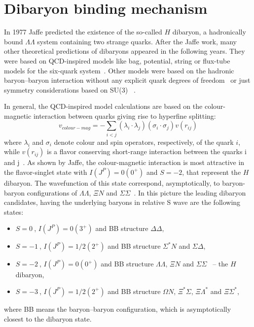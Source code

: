 %
%
\section{Dibaryon binding mechanism} \label{sec:2.1}

In 1977 Jaffe predicted the existence of the so-called $H$ dibaryon, a hadronically bound 
$\Lambda \Lambda$ system containing two strange quarks.
After the Jaffe work, many other theoretical predictions of dibaryons appeared in the following years. 
They were based on QCD-inspired models like bag, potential, string or flux-tube models for the
six-quark system~\cite{dsinevitable1,dibpred1,dibpred2,dibpred3,dibpred5,dibpred6,dibpred7,dibpred8,
dibpred9,dibpred10,dibpred11,dibpred12,dibpred13}.
Other models were based on the hadronic baryon–baryon interaction without any explicit quark degrees
of freedom~\cite{dibpred14,dibpred15,dibpred16} or just symmetry considerations based on SU(3)
~\cite{dibpred17}.

%

In general, the QCD-inspired model calculations are based on the colour-magnetic interaction between 
quarks giving rise to hyperfine splitting:
\begin{equation} \label{eq:colmag}
    v_{colour-mag} = - \sum_{i<j} (\lambda_{i} \cdot \lambda_{j}) (\sigma_{i} \cdot \sigma_{j})
    v(r_{ij})
\end{equation}
where $\lambda_{i}$ and $\sigma_{i}$ denote colour and spin operators, respectively, of the quark $i$, 
while $v(r_{ij})$ is a flavor conserving short-range interaction between the quarks i and 
j~\cite{colormag}.
As shown by Jaffe, the colour-magnetic interaction is most attractive in the flavor-singlet state with
$I(J^{P}) = 0(0^{+})$ and $S = -2$, that represent the $H$ dibaryon. The wavefunction of this state
correspond, asymptotically, to baryon-baryon configurations of $\Lambda \Lambda$, $\Xi N$ and 
$\Sigma \Sigma$~\cite{oka}. In this picture the leading dibaryon candidates, having the underlying 
baryons in relative S wave are the following states:
\begin{itemize}
    \item $S=0 \ $, $I(J^{P}) = 0(3^{+})$ and BB structure $\Delta \Delta$,
    \item $S=-1\ $, $I(J^{P}) = 1/2(2^{+})$ and BB structure $\Sigma^{*}N$ and $\Sigma \Delta$,
    \item $S=-2\ $, $I(J^{P}) = 0(0^{+})$ and BB structure $\Lambda \Lambda$, $\Xi N$ and 
$\Sigma \Sigma$ \ -- the $H$ dibaryon,
    \item $S=-3\ $, $I(J^{P}) = 1/2(2^{+})$ and BB structure $\Omega N$, $\Xi^{*} \Sigma$, 
    $\Xi \Lambda^{*}$ and $\Xi \Sigma^{*}$,
\end{itemize}
where BB means the baryon–baryon configuration, which is asymptotically closest to the dibaryon
state.

